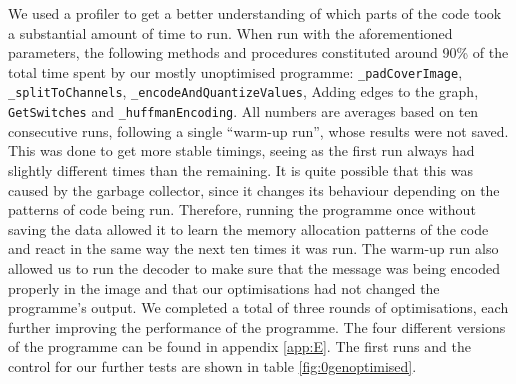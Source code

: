 We used a profiler to get a better understanding of which parts of the code took a substantial amount of time to run.
When run with the aforementioned parameters, the following methods and procedures constituted around 90\% of the total time spent by our mostly unoptimised programme:
\lstinline|_padCoverImage|, \lstinline|_splitToChannels|, \lstinline|_encodeAndQuantizeValues|, Adding edges to the graph, \lstinline|GetSwitches| and \lstinline|_huffmanEncoding|.
All numbers are averages based on ten consecutive runs, following a single ``warm-up run'', whose results were not saved.
This was done to get more stable timings, seeing as the first run always had slightly different times than the remaining.
It is quite possible that this was caused by the garbage collector, since it changes its behaviour depending on the patterns of code being run.
Therefore, running the programme once without saving the data allowed it to learn the memory allocation patterns of the code and react in the same way the next ten times it was run.
The warm-up run also allowed us to run the decoder to make sure that the message was being encoded properly in the image and that our optimisations had not changed the programme's output.
We completed a total of three rounds of optimisations, each further improving the performance of the programme.
The four different versions of the programme can be found in appendix \ref{app:E}.
The first runs and the control for our further tests are shown in table \ref{fig:0genoptimised}.

